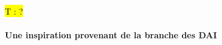 
\hl{T : ?}


\paragraph{Une inspiration provenant de la branche des DAI}
\label{p:communautes_usa}


